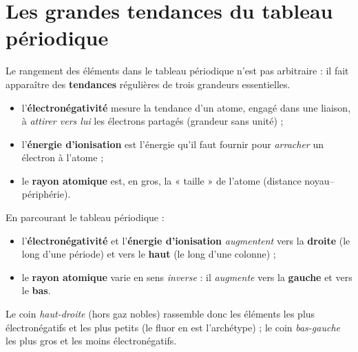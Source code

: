 \documentclass[11pt,a4paper]{article}
\begin{document}
\section{Les grandes tendances du tableau périodique}
Le rangement des éléments dans le tableau périodique n'est pas arbitraire : il fait apparaître des
\textbf{tendances} régulières de trois grandeurs essentielles.

\begin{definition}
\begin{itemize}[leftmargin=1.6em,topsep=2pt,itemsep=2pt]
  \item l'\textbf{électronégativité} mesure la tendance d'un atome, engagé dans une liaison, à
        \emph{attirer vers lui} les électrons partagés (grandeur sans unité) ;
  \item l'\textbf{énergie d'ionisation} est l'énergie qu'il faut fournir pour \emph{arracher} un
        électron à l'atome ;
  \item le \textbf{rayon atomique} est, en gros, la « taille » de l'atome (distance noyau–périphérie).
\end{itemize}
\end{definition}

\begin{theoreme}
En parcourant le tableau périodique :
\begin{itemize}[leftmargin=1.6em,topsep=2pt,itemsep=2pt]
  \item l'\textbf{électronégativité} et l'\textbf{énergie d'ionisation} \emph{augmentent} vers la
        \textbf{droite} (le long d'une période) et vers le \textbf{haut} (le long d'une colonne) ;
  \item le \textbf{rayon atomique} varie en sens \emph{inverse} : il \emph{augmente} vers la
        \textbf{gauche} et vers le \textbf{bas}.
\end{itemize}
Le coin \emph{haut-droite} (hors gaz nobles) rassemble donc les éléments les plus électronégatifs et
les plus petits (le fluor en est l'archétype) ; le coin \emph{bas-gauche} les plus gros et les moins
électronégatifs.
\end{theoreme}
\end{document}
